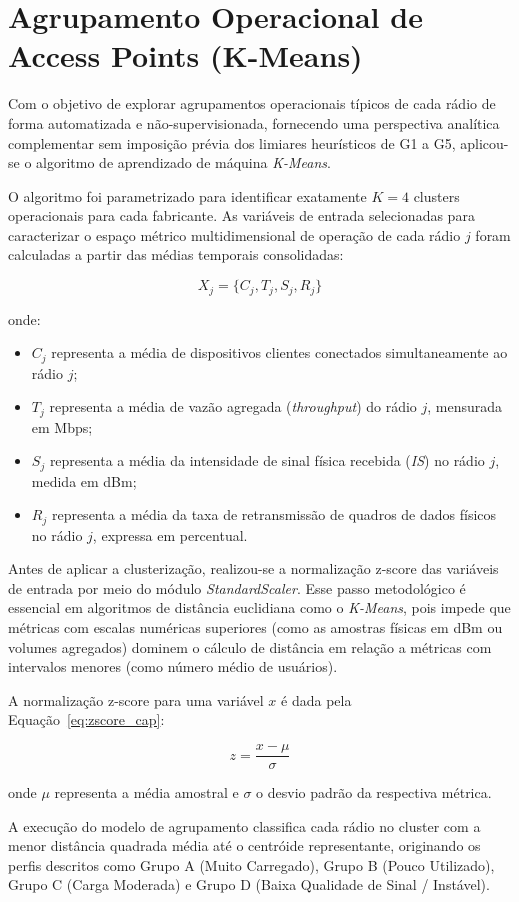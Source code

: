 \section{Agrupamento Operacional de Access Points (K-Means)}
\label{sec:kmeans_desenvolvimento_cap}

Com o objetivo de explorar agrupamentos operacionais típicos de cada rádio de forma automatizada e não-supervisionada, fornecendo uma perspectiva analítica complementar sem imposição prévia dos limiares heurísticos de G1 a G5, aplicou-se o algoritmo de aprendizado de máquina \textit{K-Means}. 

O algoritmo foi parametrizado para identificar exatamente $K=4$ clusters operacionais para cada fabricante. As variáveis de entrada selecionadas para caracterizar o espaço métrico multidimensional de operação de cada rádio $j$ foram calculadas a partir das médias temporais consolidadas:

\begin{equation}
\label{eq:features_kmeans_cap}
X_j = \{ C_j, T_j, S_j, R_j \}
\end{equation}

onde:
\begin{itemize}
	\item $C_j$ representa a média de dispositivos clientes conectados simultaneamente ao rádio $j$;
	\item $T_j$ representa a média de vazão agregada (\textit{throughput}) do rádio $j$, mensurada em Mbps;
	\item $S_j$ representa a média da intensidade de sinal física recebida (\textit{IS}) no rádio $j$, medida em dBm;
	\item $R_j$ representa a média da taxa de retransmissão de quadros de dados físicos no rádio $j$, expressa em percentual.
\end{itemize}

Antes de aplicar a clusterização, realizou-se a normalização z-score das variáveis de entrada por meio do módulo \textit{StandardScaler}. Esse passo metodológico é essencial em algoritmos de distância euclidiana como o \textit{K-Means}, pois impede que métricas com escalas numéricas superiores (como as amostras físicas em dBm ou volumes agregados) dominem o cálculo de distância em relação a métricas com intervalos menores (como número médio de usuários).

A normalização z-score para uma variável $x$ é dada pela Equação~\ref{eq:zscore_cap}:

\begin{equation}
\label{eq:zscore_cap}
z = \frac{x - \mu}{\sigma}
\end{equation}

onde $\mu$ representa a média amostral e $\sigma$ o desvio padrão da respectiva métrica.

A execução do modelo de agrupamento classifica cada rádio no cluster com a menor distância quadrada média até o centróide representante, originando os perfis descritos como Grupo A (Muito Carregado), Grupo B (Pouco Utilizado), Grupo C (Carga Moderada) e Grupo D (Baixa Qualidade de Sinal / Instável).


